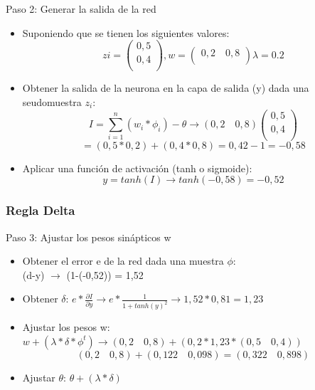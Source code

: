 \documentclass[
	11pt, %
]{beamer}
\begin{document}
\begin{frame}
  Paso 2: Generar la salida de la red

  \begin{itemize}

  \item Suponiendo que se tienen los siguientes valores:
    \[zi = \begin{pmatrix}
      0,5\\
      0,4\\
    \end{pmatrix}, w=\begin{pmatrix} 0,2 \quad 0,8\\ \end{pmatrix} \lambda = 0.2\]

  \item Obtener la salida de la neurona en la capa de salida (y) dada una seudomuestra $z_{i}$:
    \[I = \sum_{i=1} ^{n} (w_{i} * \phi_{i})-\theta \rightarrow (0,2 \quad 0,8)\begin{pmatrix}0,5\\0,4\\\end{pmatrix} \]\[= (0,5*0,2) + (0,4*0,8) = 0,42-1 = -0,58\]

    \item Aplicar una función de activación (tanh o sigmoide):
      \[y = tanh(I) \rightarrow tanh(-0,58) = -0,52\]
      
  \end{itemize}
\end{frame}

\begin{frame}
  \frametitle{Regla Delta}

  Paso 3: Ajustar los pesos sinápticos w

  \bigskip %
  
  \begin{itemize}
  \item Obtener el error e de la red dada una muestra $\phi$: \\
    (d-y) $\rightarrow$ (1-(-0,52)) = 1,52
  \item Obtener $\delta$: $e*\frac{\partial I}{\partial y}\rightarrow e*\frac{1}{1+tanh(y)^{2}} \rightarrow 1,52*0,81 = 1,23$
  \item Ajustar los pesos w: $w+(\lambda*\delta*\phi^{t})\rightarrow (0,2 \quad 0,8)+(0,2*1,23*(0,5 \quad 0,4))$
    \[(0,2 \quad 0,8)+(0,122 \quad 0,098) = (0,322 \quad 0,898)\]
  \item Ajustar $\theta$: $\theta + (\lambda * \delta)$
  \end{itemize}
  
\end{frame}
\end{document}
